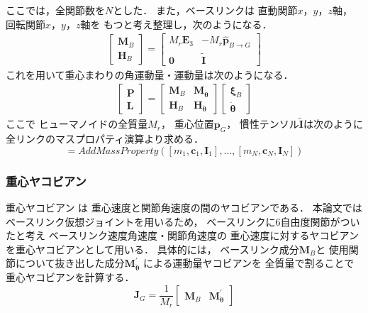 ここでは，全関節数を$N$とした．
また，ベースリンクは
直動関節$x$，$y$，$z$軸，
回転関節$x$，$y$，$z$軸を
もつと考え整理し，次のようになる．
\begin{eqnarray}
\left[
\begin{array}{c}
\bm{M}_{B}\\
\bm{H}_{B}
\end{array}
\right]
=
\left[
\begin{array}{cc}
M_{r} \bm{E}_3 & - M_{r} \hat{\bm{p}}_{B\to G}\\
\bm{0} & \tilde{\bm{I}}
\end{array}
\right]
\end{eqnarray}
これを用いて重心まわりの角運動量・運動量は次のようになる．
\begin{eqnarray}
\left[
\begin{array}{c}
\bm{P}\\
\bm{L}
\end{array}
\right]
=
\left[
\begin{array}{cc}
\bm{M}_{B} & \bm{M}_{\dot{\bm{\theta}}}\\
\bm{H}_{B} & \bm{H}_{\dot{\bm{\theta}}}
\end{array}
\right]
\left[
\begin{array}{c}
\bm{\xi}_{B}\\
\dot{\bm{\theta}}
\end{array}
\right]
\end{eqnarray}
ここで
ヒューマノイドの全質量$M_{r}$，
重心位置$\bm{p}_{G}$，
慣性テンソル$\tilde{\bm{I}}$は次のように
全リンクのマスプロパティ演算より求める．
\begin{equation}
[M_{r}, \bm{p}_{G}, \tilde{\bm{I}}]
= AddMassProperty(
[m_{1}, \bm{c}_{1}, \bm{I}_{1}]
,\hdots,
[m_{N}, \bm{c}_{N}, \bm{I}_{N}]
)
\end{equation}

\subsubsection{重心ヤコビアン}
重心ヤコビアン%
は
重心速度と関節角速度の間のヤコビアンである．
本論文ではベースリンク仮想ジョイントを用いるため，
ベースリンクに6自由度関節がついたと考え
ベースリンク速度角速度・関節角速度の
重心速度に対するヤコビアンを重心ヤコビアンとして用いる．
具体的には，
ベースリンク成分$\bm{M}_{B}$と
使用関節について抜き出した成分$\bm{M}_{\dot{\bm{\theta}}}^{\prime}$
による運動量ヤコビアンを
全質量で割ることで重心ヤコビアンを計算する．
\begin{equation}
\bm{J}_{G} = 
\frac{1}{M_{r}}
\left[
\begin{array}{cc}
\bm{M}_{B} & \bm{M}_{\dot{\bm{\theta}}}^{\prime}
\end{array}
\right]
\end{equation}


